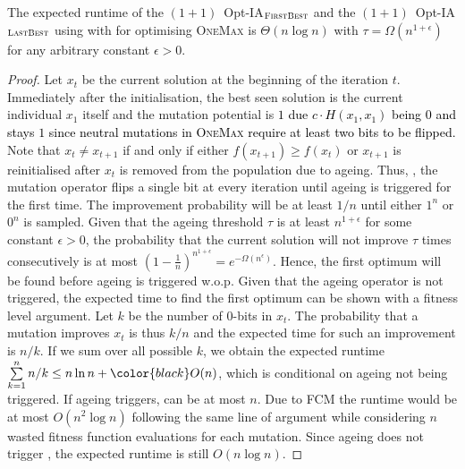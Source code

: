 
\begin{theorem} \label{thm:onemaxexpo}
	The expected runtime of the $(1+1)$~Opt-IA$_{\textsc{FirstBest}}$ and the $(1+1)$~Opt-IA$_{\textsc{LastBest}}$ using \IPHfcm{}  %
	with {\linHD }  for optimising
	\textsc{OneMax} is $\Theta(n\log n)$ with $\tau=\Omega(n^{1+\epsilon})$ for any arbitrary constant $\epsilon>0$.
\end{theorem}
\begin{proof}
	Let $x_t$ be the current solution at the beginning of the iteration $t$. Immediately after the initialisation, the best seen solution is the current individual $x_1$ itself and the mutation potential  is %
		\textcolor{black}{$1$ due  $c\cdot H(x_1,x_1)$ being $0$ and stays $1$ since neutral mutations in \textsc{OneMax} require at least two bits to be flipped.} Note that  $x_t \neq x_{t+1}$ if and only if either $f(x_{t+1})\geq f(x_t)$ or $x_{t+1}$ is reinitialised after $x_t$ is removed from the population due to ageing. Thus, , the mutation operator flips a single bit at every iteration until ageing is triggered for the first time.
		The improvement probability will be at least $ 1/n $ until either $1^n$ or $0^n$ is sampled. 
		Given that the ageing threshold $\tau$  is at least $n^{1+\epsilon}$ for some constant $\epsilon >0 $, 
		the probability that the current solution will not improve $\tau$ times consecutively is at most 
		$(1-\frac{1}{n})^{n^{1+\epsilon}}=e^{-\Omega(n^\epsilon)}$. 
		Hence, the first optimum will be found before ageing is triggered w.o.p. Given that the ageing operator is not triggered, the expected time to find the first optimum can be shown with a fitness level argument. Let $k$ be the number of $0$-bits in $x_t$. The probability that a mutation improves $x_t$ is thus $k/n$ and the expected time for such an improvement is $n/k$. If we sum over all possible $k$, we obtain the expected runtime $\sum\limits_{k=1}^{n}n/k \leq n \ln n + {\color{black}O(n) } $, which is conditional on ageing not being triggered. If ageing triggers,  can be at most $n$. Due to FCM the runtime would be at most $O(n^2 \log n)$ following the same line of argument while considering $n$ wasted fitness function evaluations for each mutation. %
		Since ageing does not trigger , the expected runtime is still $O(n \log{n})$.
		

\end{proof}
